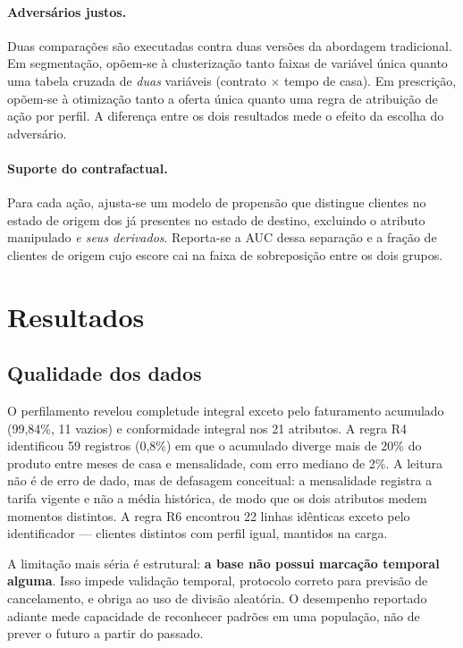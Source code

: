 \documentclass[10pt,a4paper]{article}
\begin{document}
\paragraph{Adversários justos.} Duas comparações são executadas contra duas versões da
abordagem tradicional. Em segmentação, opõem-se à clusterização tanto faixas de variável
única quanto uma tabela cruzada de \emph{duas} variáveis (contrato \(\times\) tempo de casa).
Em prescrição, opõem-se à otimização tanto a oferta única quanto uma regra de atribuição de
ação por perfil. A diferença entre os dois resultados mede o efeito da escolha do adversário.

\paragraph{Suporte do contrafactual.}
\label{sec:prescritiva}
Para cada ação, ajusta-se um modelo de propensão que distingue clientes no estado de
origem dos já presentes no estado de destino, excluindo o atributo manipulado \emph{e seus
derivados}. Reporta-se a AUC dessa separação e a fração de clientes de origem cujo escore
cai na faixa de sobreposição entre os dois grupos.

\section{Resultados}
\label{sec:resultados}

\subsection{Qualidade dos dados}

O perfilamento revelou completude integral exceto pelo faturamento acumulado (99,84\%, 11
vazios) e conformidade integral nos 21 atributos. A regra R4 identificou 59 registros (0,8\%)
em que o acumulado diverge mais de 20\% do produto entre meses de casa e mensalidade, com erro
mediano de 2\%. A leitura não é de erro de dado, mas de defasagem conceitual: a mensalidade
registra a tarifa vigente e não a média histórica, de modo que os dois atributos medem
momentos distintos. A regra R6 encontrou 22 linhas idênticas exceto pelo identificador ---
clientes distintos com perfil igual, mantidos na carga.

A limitação mais séria é estrutural: \textbf{a base não possui marcação temporal alguma}.
Isso impede validação temporal, protocolo correto para previsão de cancelamento, e obriga ao
uso de divisão aleatória. O desempenho reportado adiante mede capacidade de reconhecer padrões
em uma população, não de prever o futuro a partir do passado.
\end{document}
